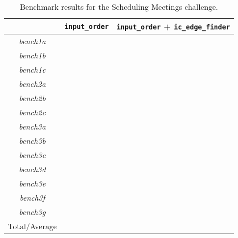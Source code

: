 \begin{table}[H]
\centering
\bgroup
\def\arraystretch{1.3}
\begin{tabular}{cll}
\multicolumn{1}{l}{} & \texttt{input\_order} & \texttt{input\_order} + \texttt{ic\_edge\_finder} \\ \hline
\textit{bench1a}      &              &                                 \\
\textit{bench1b}      &              &                                 \\
\textit{bench1c}      &              &                                 \\
\textit{bench2a}      &              &                                 \\
\textit{bench2b}      &              &                                 \\
\textit{bench2c}      &              &                                 \\
\textit{bench3a}      &              &                                 \\
\textit{bench3b}      &              &                                 \\
\textit{bench3c}      &              &                                 \\
\textit{bench3d}      &              &                                 \\
\textit{bench3e}      &              &                                 \\
\textit{bench3f}      &              &                                 \\
\textit{bench3g}      &              &                                 \\\hline
Total/Average        &              &                                
\end{tabular}
\egroup
\caption{Benchmark results for the Scheduling Meetings challenge.}
\label{tab:sche1}
\end{table}